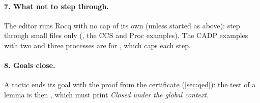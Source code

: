 \paragraph{7. What not to step through.} The editor runs Rocq with no cap
of its own (unless started as above): step through small files only
(, the CCS and Proc examples). The CADP examples with
two and three processes are for , which caps each
step.

\paragraph{8. Goals close.} A tactic ends its goal with the proof from
the certificate (\cref{sec:qed}): the test of a lemma  is
 then , which must
print \emph{Closed under the global context}.
